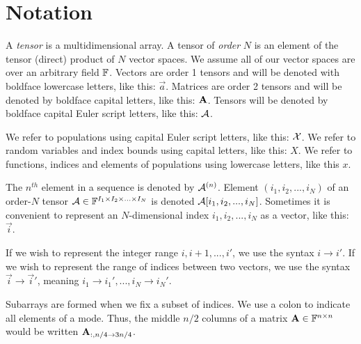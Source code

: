 
\section{Notation}
    A \textit{tensor} is a multidimensional array. A tensor of \textit{order} $N$ is an element of the tensor (direct) product of $N$ vector spaces. We assume all of our vector spaces are over an arbitrary field $\mathbb{F}$. Vectors are order 1 tensors and will be denoted with boldface lowercase letters, like this: $\vec{a}$. Matrices are order 2 tensors and will be denoted by boldface capital letters, like this: $\mathbf{A}$. Tensors will be denoted by boldface capital Euler script letters, like this: $\mathbf{\mathcal{A}}$.

    We refer to populations using capital Euler script letters, like this: $\mathcal{X}$. We refer to random variables and index bounds using capital letters, like this: $X$. We refer to functions, indices and elements of populations using lowercase letters, like this $x$.

    The $n^{th}$ element in a sequence is denoted by $\mathbf{\mathcal{A}}^{(n)}$.
    Element $(i_1, i_2, ..., i_N)$ of an order-$N$ tensor $\mathbf{\mathcal{A}} \in \mathbb{F}^{I_1 \times I_2 \times ... \times I_N}$ is denoted $ \mathbf{\mathcal{A}}[i_1, i_2, ..., i_N]$.
    Sometimes it is convenient to represent an $N$-dimensional index $i_1, i_2, ..., i_N$ as a vector, like this: $\vec{i}$.

    If we wish to represent the integer range $i, i + 1, ..., i'$, we use the syntax $i \to i'$. If we wish to represent the range of indices between two vectors, we use the syntax $\vec{i} \to \vec{i}'$, meaning $i_1 \to i_1', ..., i_N \to i_N'$.

    Subarrays are formed when we fix a subset of indices. We use a colon to indicate all elements of a mode. Thus, the middle $n/2$ columns of a matrix $\mathbf{A} \in \mathbb{F}^{n \times n}$ would be written $\mathbf{A}_{:, n/4 \to 3n/4}$.

